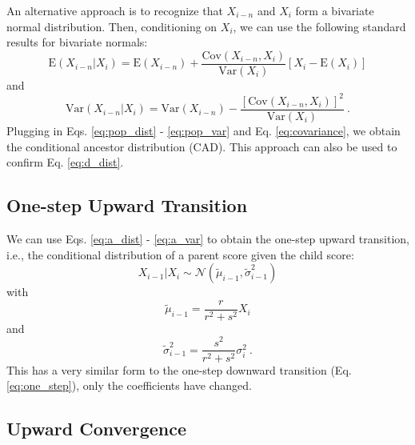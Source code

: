 \documentclass{svproc} %
\begin{document}
An alternative approach is to recognize that $X_{i-n}$ and $X_i$ form a bivariate normal distribution. Then, conditioning on $X_i$, we can use the following standard results for bivariate normals: 
\begin{equation}
\mathrm{E}(X_{i-n}|X_i) = \mathrm{E}(X_{i-n}) + \frac{\mathrm{Cov}(X_{i-n}, X_i)}{\mathrm{Var}(X_i)}[X_i - \mathrm{E}(X_i)]
\end{equation}
and 
\begin{equation}
\mathrm{Var}(X_{i-n}|X_i) = \mathrm{Var}(X_{i-n}) - \frac{[\mathrm{Cov}(X_{i-n}, X_i)]^2}{\mathrm{Var}(X_i)} \ .
\end{equation}
Plugging in Eqs. \ref{eq:pop_dist} - \ref{eq:pop_var} and Eq. \ref{eq:covariance}, we obtain the conditional ancestor distribution (CAD). This approach can also be used to confirm Eq. \ref{eq:d_dist}.

\subsection{One-step Upward Transition}
We can use Eqs. \ref{eq:a_dist} - \ref{eq:a_var} to obtain the one-step upward transition, i.e., the conditional distribution of a parent score given the child score:
\begin{equation}
X_{i-1}|X_i \sim \mathcal{N}( \tilde{\mu}_{i-1}, \tilde{\sigma}_{i-1}^2)
\label{eq:up_dist}
\end{equation}
with
\begin{equation}
\tilde{\mu}_{i-1} = \frac{r}{r^2+s^2} X_i
\label{eq:up_mean}
\end{equation}
and
\begin{equation}
\tilde{\sigma}_{i-1}^2 = \frac{s^2}{r^2+s^2} \sigma_i^2 \ .
\label{eq:up_var}
\end{equation}
This has a very similar form to the one-step downward transition (Eq. \ref{eq:one_step}), only the coefficients have changed.


\subsection{Upward Convergence}
\end{document}
